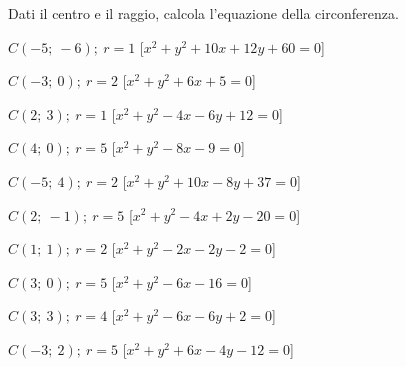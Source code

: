 \begin{esercizio}\label{ese:}
 Dati il centro e il raggio, calcola l'equazione della circonferenza.
 \begin{enumeratea}
  \item  \(C \left (-5;~-6 \right );~r = 1\)
   \hfill [\(x^2 + y^2 +10x +12y +60 = 0\)]
  \item  \(C \left (-3;~0 \right );~r = 2\)
   \hfill [\(x^2 + y^2 +6x +5 = 0\)]
  \item  \(C \left (2;~3 \right );~r = 1\)
   \hfill [\(x^2 + y^2 -4x -6y +12 = 0\)]
  \item  \(C \left (4;~0 \right );~r = 5\)
   \hfill [\(x^2 + y^2 -8x -9 = 0\)]
  \item  \(C \left (-5;~4 \right );~r = 2\)
   \hfill [\(x^2 + y^2 +10x -8y +37 = 0\)]
  \item  \(C \left (2;~-1 \right );~r = 5\)
   \hfill [\(x^2 + y^2 -4x +2y -20 = 0\)]
  \item  \(C \left (1;~1 \right );~r = 2\)
   \hfill [\(x^2 + y^2 -2x -2y -2 = 0\)]
  \item  \(C \left (3;~0 \right );~r = 5\)
   \hfill [\(x^2 + y^2 -6x -16 = 0\)]
  \item  \(C \left (3;~3 \right );~r = 4\)
   \hfill [\(x^2 + y^2 -6x -6y +2 = 0\)]
  \item  \(C \left (-3;~2 \right );~r = 5\)
   \hfill [\(x^2 + y^2 +6x -4y -12 = 0\)]
 \end{enumeratea}
\end{esercizio}



